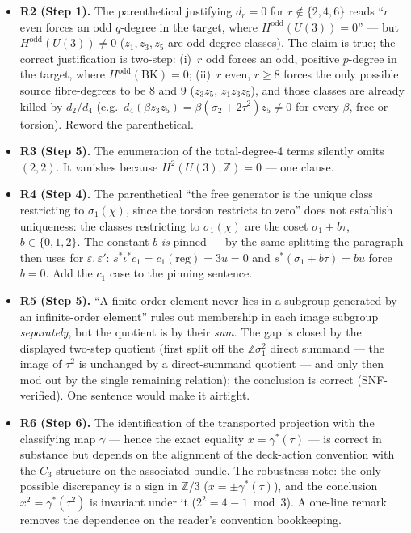 \documentclass[11pt,a4paper]{article}
\newcommand{\Z}{\mathbb{Z}}
\newcommand{\BK}{\mathrm{BK}}
\begin{document}
\begin{itemize}[leftmargin=1.4em,itemsep=3pt]
\item \textbf{R2 (Step 1).} The parenthetical justifying $d_r=0$ for
$r\notin\{2,4,6\}$ reads ``$r$ even forces an odd $q$-degree in the target,
where $H^{\mathrm{odd}}(U(3))=0$'' --- but $H^{\mathrm{odd}}(U(3))\ne0$
($z_1,z_3,z_5$ are odd-degree classes). The claim is true; the correct
justification is two-step: (i)~$r$ odd forces an odd, positive $p$-degree in
the target, where $H^{\mathrm{odd}}(\BK)=0$; (ii)~$r$ even, $r\ge8$ forces
the only possible source fibre-degrees to be $8$ and $9$ ($z_3z_5$,
$z_1z_3z_5$), and those classes are already killed by $d_2/d_4$ (e.g.\
$d_4(\beta z_3z_5)=\beta(\sigma_2+2\tau^2)z_5\ne0$ for every $\beta$, free or
torsion). Reword the parenthetical.

\item \textbf{R3 (Step 5).} The enumeration of the total-degree-4 terms
silently omits $(2,2)$. It vanishes because $H^2(U(3);\Z)=0$ --- one clause.

\item \textbf{R4 (Step 4).} The parenthetical ``the free generator is the
unique class restricting to $\sigma_1(\chi)$, since the torsion restricts to
zero'' does not establish uniqueness: the classes restricting to
$\sigma_1(\chi)$ are the coset $\sigma_1+b\tau$, $b\in\{0,1,2\}$. The
constant $b$ \emph{is} pinned --- by the same splitting the paragraph then
uses for $\varepsilon,\varepsilon'$: $s^*\iota^*c_1=c_1(\mathrm{reg})=3u=0$
and $s^*(\sigma_1+b\tau)=bu$ force $b=0$. Add the $c_1$ case to the pinning
sentence.

\item \textbf{R5 (Step 5).} ``A finite-order element never lies in a subgroup
generated by an infinite-order element'' rules out membership in each image
subgroup \emph{separately}, but the quotient is by their \emph{sum}. The gap
is closed by the displayed two-step quotient (first split off the
$\Z\sigma_1^2$ direct summand --- the image of $\tau^2$ is unchanged by a
direct-summand quotient --- and only then mod out by the single remaining
relation); the conclusion is correct (SNF-verified). One sentence would make
it airtight.

\item \textbf{R6 (Step 6).} The identification of the transported projection
with the classifying map $\gamma$ --- hence the exact equality
$x=\gamma^*(\tau)$ --- is correct in substance but depends on the alignment
of the deck-action convention with the $C_3$-structure on the associated
bundle. The robustness note: the only possible discrepancy is a sign in
$\Z/3$ ($x=\pm\gamma^*(\tau)$), and the conclusion $x^2=\gamma^*(\tau^2)$ is
invariant under it ($2^2=4\equiv1\bmod3$). A one-line remark removes the
dependence on the reader's convention bookkeeping.


\end{itemize}
\end{document}
